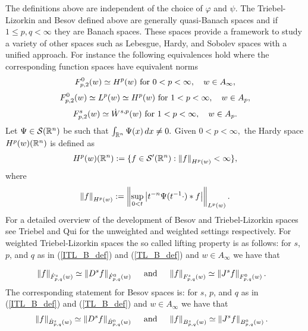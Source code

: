 {The definitions above are independent of the choice of $\varphi$ and $\psi$. The Triebel-Lizorkin and Besov defined above are generally quasi-Banach spaces and if $1\leq p,q <\infty$ they are Banach spaces. These spaces provide a framework to study a variety of other spaces such as Lebesgue, Hardy, and Sobolev spaces with a unified approach.  For instance the following equivalences hold where the corresponding function spaces have equivalent norms 
\begin{equation}\label{TL&Hardy}
 \itlw{p}{0}{2}{w} \simeq H^p (w) \text{ for } 0<p<\infty, \quad w\in A_\infty, 
\end{equation}
\begin{equation}
 \itlw{p}{0}{2}{w} \simeq L^p(w) \simeq H^p(w) \text{ for } 1<p<\infty, \quad w\in A_p, 
\end{equation}
\begin{equation}
 \itlw{p}{s}{2}{w} \simeq \dot{W}^{s,p}(w) \text{ for } 1<p<\infty, \quad w\in A_p.
\end{equation}
Let $\Psi\in \sw$ be such that $\int_{\rn}\Psi(x)\dx\neq 0.$ Given $0<p<\infty,$ the  Hardy space $H^p(w)(\rn)$ is defined as 
\begin{equation*}
H^p(w)(\re^n) :=\{f \in \swp: \norm{f}{H^p(w)}< \infty \},
\end{equation*}
where 
\[
\norm{f}{H^p(w)}:= \norm{\sup_{0<t} \abs{t^{-n}\Psi(t^{-1}\cdot)\ast f}}{L^p(w)} .
\]
For a detailed overview of the development of Besov and Triebel-Lizorkin spaces see Triebel \cite{MR3024598} and Qui \cite{MR676560} for the unweighted and weighted settings respectively.
For weighted Triebel-Lizorkin spaces the so called lifting property is as follows: for $s$, $p$, and $q$ as in (\ref{ITL_B_def}) and (\ref{TL_B_def}) and $w\in A_\infty$ we have that 

 \begin{align*}
 & \norm{f}{\tlw{p}{s}{q}{w}}\simeq\norm{D^s f}{\tlw{p}{0}{q}{w}} \quad \text{ and } \quad \norm{f}{\itlw{p}{s}{q}{w}}\simeq\norm{J^s f}{\itlw{p}{0}{q}{w}}.
 \end{align*}
The corresponding statement for Besov spaces is: for $s$, $p$, and $q$ as in (\ref{ITL_B_def}) and (\ref{TL_B_def}) and $w\in A_\infty$ we have that 
 \begin{align*}
 & \norm{f}{\besw{p}{s}{q}{w}}\simeq\norm{D^s f}{\besw{p}{0}{q}{w}} \quad \text{ and } \quad \norm{f}{\ibesw{p}{s}{q}{w}}\simeq\norm{J^s f}{\ibesw{p}{0}{q}{w}}.
 \end{align*}
 

}
